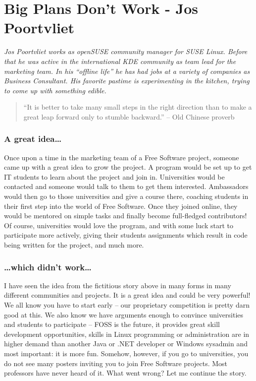 \chapter{Big Plans Don't Work - Jos Poortvliet}

\textit{Jos Poortvliet works as openSUSE community manager for SUSE Linux. Before that he was active in the international KDE community as team lead for the marketing team. In his ``offline life'' he has had jobs at a variety of companies as Business Consultant. His favorite pastime is experimenting in the kitchen, trying to come up with something edible.}

\begin{quote}``It is better to take many small steps in the right direction than to make a great leap forward only to stumble backward.'' -- Old Chinese proverb\end{quote}

\subsection*{A great idea\dots}
Once upon a time in the marketing team of a Free Software project, someone came up with a great idea to grow the project. A program would be set up to get IT students to learn about the project and join in. Universities would be contacted and someone would talk to them to get them interested. Ambassadors would then go to those universities and give a course there, coaching students in their first step into the world of Free Software. Once they joined online, they would be mentored on simple tasks and finally become full-fledged contributors! Of course, universities would love the program, and with some luck start to participate more actively, giving their students assignments which result in code being written for the project, and much more.

\subsection*{\dots which didn't work\dots}
I have seen the idea from the fictitious story above in many forms in many different communities and projects. It is a great idea and could be very powerful! We all know you have to start early -- our proprietary competition is pretty darn good at this. We also know we have arguments enough to convince universities and students to participate -- FOSS is the future, it provides great skill development opportunities, skills in Linux programming or administration are in higher demand than another Java or .NET developer or Windows sysadmin and most important: it is more fun. Somehow, however, if you go to universities, you do not see many posters inviting you to join Free Software projects. Most professors have never heard of it. What went wrong? Let me continue the story.

